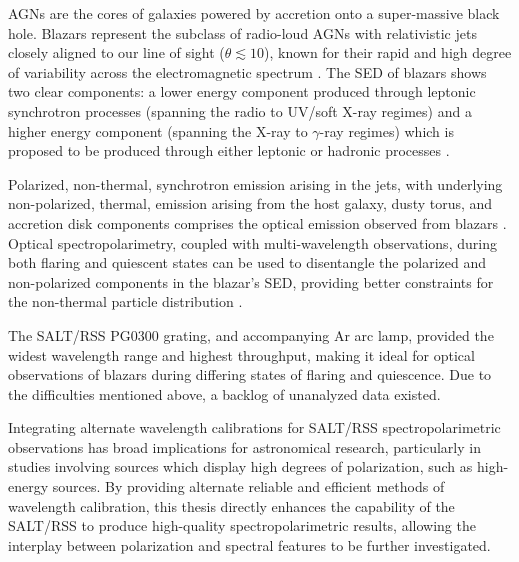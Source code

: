 


\glspl{AGN} are the cores of galaxies powered by accretion onto a super-massive black hole.
Blazars represent the subclass of radio-loud \glspl{AGN} with relativistic jets closely aligned to our line of sight ($\theta \lesssim 10$\degree), known for their rapid and high degree of variability across the electromagnetic spectrum \citep{Urry_1995}.
The \gls{SED} of blazars shows two clear components:
a lower energy component produced through leptonic synchrotron processes (spanning the radio to \gls{UV}/soft X-ray regimes)
and a higher energy component (spanning the X-ray to $\gamma$-ray regimes) which is proposed to be produced through either leptonic or hadronic processes \citep{Bottcher_2013}.

Polarized, non-thermal, synchrotron emission arising in the jets, with underlying non-polarized, thermal, emission arising from the host galaxy, dusty torus, and accretion disk components comprises the optical emission observed from blazars \citep{Ghisellini_2009}.
Optical spectropolarimetry, coupled with multi-wavelength observations, during both flaring and quiescent states can be used to disentangle the polarized and non-polarized components in the blazar's \gls{SED}, providing better constraints for the non-thermal particle distribution \citep{Schutte_COSPAR, Schutte4C0102}.

The \gls{SALT}/\gls{RSS} PG$0300$ grating, and accompanying \gls{Ar} arc lamp, provided the widest wavelength range and highest throughput, making it ideal for optical observations of blazars during differing states of flaring and quiescence.
Due to the difficulties mentioned above, a backlog of unanalyzed data existed.

Integrating alternate wavelength calibrations for \gls{SALT}/\gls{RSS} spectro\-polarimetric observations has broad implications for astronomical research, particularly in studies involving sources which display high degrees of polarization, such as high-energy sources.
By providing alternate reliable and efficient methods of wavelength calibration, this thesis directly enhances the capability of the \gls{SALT}/\gls{RSS} to produce high-quality spectropolarimetric results, allowing the interplay between polarization and spectral features to be further investigated.


